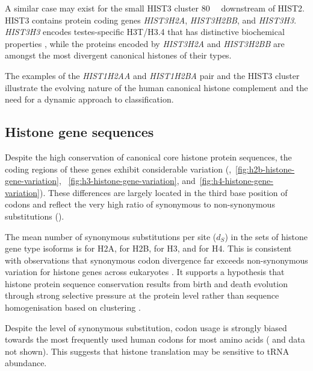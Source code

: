     A similar case may exist for the small HIST3 cluster \SI{80}{\mega\bp} downstream of HIST2.
    HIST3 contains protein coding genes \textit{HIST3H2A}, \textit{HIST3H2BB}, and \textit{HIST3H3}.
    \textit{HIST3H3} encodes testes-specific H3T/H3.4
    that has distinctive biochemical properties \citep{WittExpCellRes1996,KurumizakaCOSB2013},
    while the proteins encoded by \textit{HIST3H2A} and \textit{HIST3H2BB}
    are amongst the most divergent canonical histones of their types.

    The examples of the \textit{HIST1H2AA} and \textit{HIST1H2BA} pair
    and the HIST3 cluster illustrate
    the evolving nature of the human canonical histone complement
    and the need for a dynamic approach to classification.

  \subsection{Histone gene sequences}
    Despite the high conservation of canonical core histone protein sequences,
    the coding regions of these genes exhibit considerable variation
    (,~\ref{fig:h2b-histone-gene-variation},
    ~\ref{fig:h3-histone-gene-variation}, and~\ref{fig:h4-histone-gene-variation}).
    These differences are largely located in the third base position of codons
    and reflect the very high ratio of synonymous to non-synonymous
    substitutions ().

    The mean number of synonymous substitutions per site ($d_S$)
    in the sets of histone gene type isoforms is
     \result{} for H2A,
     \result{} for H2B,
     \result{} for H3,
    and  \result{} for H4.
    This is consistent with observations that
    synonymous codon divergence far exceeds non-synonymous variation
    for histone genes across eukaryotes \citep{Piontkivska2002, Rooney2002}.
    It supports a hypothesis that histone protein sequence conservation
    results from birth and death evolution through strong selective pressure
    at the protein level rather than
    sequence homogenisation based on clustering \citep{NeiRooney2005}.

    Despite the level of synonymous substitution,
    codon usage is strongly biased towards the most frequently used
    human codons for most amino acids ( and data not shown).
    This suggests that histone translation may be sensitive to tRNA abundance.

